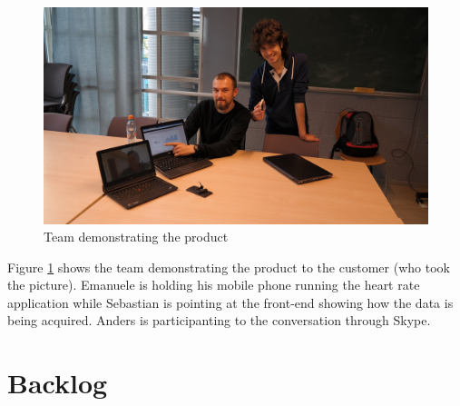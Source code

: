 \begin{figure}[H]
\centering
\includegraphics[scale=0.40]{../Figures/demo-m1.jpg}
\caption{Team demonstrating the product}
\label{figure:demonstration-m1}
\end{figure}

Figure \ref{figure:demonstration-m1} shows the team demonstrating the product to the customer (who took the picture).
Emanuele is holding his mobile phone running the heart rate application while Sebastian is pointing at the front-end showing how the data is being acquired. 
Anders is participanting to the conversation through Skype.

\clearpage
\section{Backlog}

